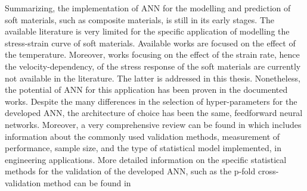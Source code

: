 Summarizing, the implementation of ANN for the modelling and prediction of soft materials, such as composite materials, is still in its early stages. The available literature is very limited for the specific application of modelling the stress-strain curve of soft materials. Available works are focused on the effect of the temperature. Moreover, works focusing on the effect of the strain rate, hence the velocity-dependency, of the stress response of the soft materials are currently not available in the literature. The latter is addressed in this thesis. Nonetheless, the potential of ANN for this application has been proven in the documented works. Despite the many differences in the selection of hyper-parameters for the developed ANN, the architecture of choice has been the same, feedforward neural networks. Moreover, a very comprehensive review can be found in \cite{paliwal2009neural} which includes information about the commonly used validation methods, measurement of performance, sample size, and the type of statistical model implemented, in engineering applications. More detailed information on the specific statistical methods for the validation of the developed ANN, such as the p-fold cross-validation method can be found in \cite{wang2007review,koskela2003neural}





